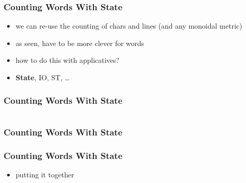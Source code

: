 \documentclass[aspectratio=169]{beamer}
\begin{document}
\begin{frame}
  \frametitle{Counting Words \textemdash{} With State}
  \begin{itemize}
  \item we can re-use the counting of chars and lines (and any monoidal metric)
  \item as seen, have to be more clever for words
  \item how to do this with applicatives?
  \item \textbf{State}, IO, ST, \ldots{}
  \end{itemize}
\end{frame}

\begin{frame}[fragile]
  \frametitle{Counting Words \textemdash{} With State}
  \inputminted[fontsize=\small]{scala}{snippets/count-words-state.scala}
\end{frame}

\begin{frame}[fragile]
  \frametitle{Counting Words \textemdash{} With State}
  \begin{center}
  \end{center}
\end{frame}

\begin{frame}[fragile]
  \frametitle{Counting Words \textemdash{} With State}
  \begin{itemize}
  \item putting it together
  \end{itemize}
  \vspace{5mm}
  \inputminted[fontsize=\small]{scala}{snippets/count-words-applicative.scala}
\end{frame}
\end{document}
